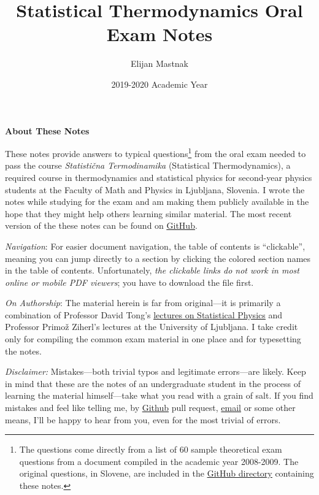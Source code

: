 \documentclass[11pt, a4paper]{article}
\begin{document}
\vspace{-10mm}
\title{Statistical Thermodynamics Oral Exam Notes}
\author{Elijan Mastnak}
\date{2019-2020 Academic Year}
\maketitle

\begin{center}
\textbf{About These Notes}
\end{center}
These notes provide answers to typical questions\footnote{The questions come directly from a list of 60 sample theoretical exam questions from a document compiled in the academic year 2008-2009. The original questions, in Slovene, are included in the \href{https://github.com/ejmastnak/fmf/tree/main/statistical-thermodynamics/std-oral-exam-notes}{\underline{GitHub directory}} containing these notes.} from the oral exam needed to pass the course \textit{Statisti\v{c}na Termodinamika} (Statistical Thermodynamics), a required course in thermodynamics and statistical physics for second-year physics students at the Faculty of Math and Physics in Ljubljana, Slovenia. I wrote the notes while studying for the exam and am making them publicly available in the hope that they might help others learning similar material. The most recent version of the these notes can be found on \href{https://github.com/ejmastnak/fmf/tree/main/statistical-thermodynamics}{\underline{GitHub}}.

\vspace{2mm}
\textit{Navigation}: For easier document navigation, the table of contents is ``clickable'', meaning you can jump directly to a section by clicking the colored section names in the table of contents. Unfortunately, \textit{the clickable links do not work in most online or mobile PDF viewers}; you have to download the file first.

\vspace{2mm}
\textit{On Authorship}: The material herein is far from original---it is primarily a combination of Professor David Tong's \href{http://www.damtp.cam.ac.uk/user/tong/statphys.html}{\underline{lectures on Statistical Physics}} and Professor Primo\v{z} Ziherl's lectures at the University of Ljubljana. I take credit only for compiling the common exam material in one place and for typesetting the notes.

\vspace{2mm}
\textit{Disclaimer:} Mistakes---both trivial typos and legitimate errors---are likely. Keep in mind that these are the notes of an undergraduate student in the process of learning the material himself---take what you read with a grain of salt. If you find mistakes and feel like telling me, by \href{https://github.com/ejmastnak/fmf}{Github} pull request, \href{mailto:ejmastnak@gmail.com}{email} or some other means, I'll be happy to hear from you, even for the most trivial of errors.
\end{document}
